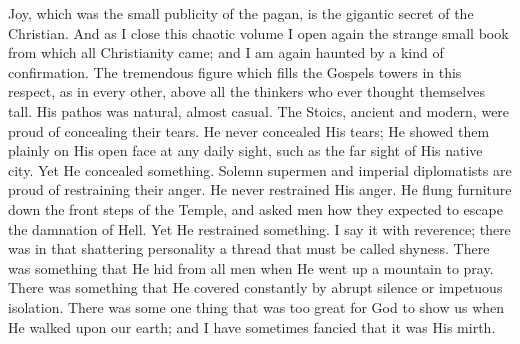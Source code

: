 Joy, which was the small publicity of the pagan, is the gigantic secret of the Christian. And as I close this chaotic volume I open again the strange small book from which all Christianity came; and I am again haunted by a kind of confirmation. The tremendous figure which fills the Gospels towers in this respect, as in every other, above all the thinkers who ever thought themselves tall. His pathos was natural, almost casual. The Stoics, ancient and modern, were proud of concealing their tears. He never concealed His tears; He showed them plainly on His open face at any daily sight, such as the far sight of His native city. Yet He concealed something. Solemn supermen and imperial diplomatists are proud of restraining their anger. He never restrained His anger. He flung furniture down the front steps of the Temple, and asked men how they expected to escape the damnation of Hell. Yet He restrained something. I say it with reverence; there was in that shattering personality a thread that must be called shyness. There was something that He hid from all men when He went up a mountain to pray. There was something that He covered constantly by abrupt silence or impetuous isolation. There was some one thing that was too great for God to show us when He walked upon our earth; and I have sometimes fancied that it was His mirth.
